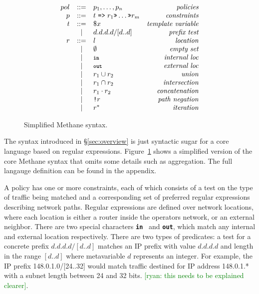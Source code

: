 \documentclass{sig-alternate-10pt}
\newcommand{\ryan}[1]{\textcolor{green}{[ryan: #1]}}
\newcommand{\sysname}{{\small \sf Methane}\xspace}
\newcommand{\KW}[1]{\texttt{\small\bfseries{#1}}}
\newcommand{\Prefer}{\texttt{>>}}
\newcommand{\Path}{\texttt{=>}}
\newcommand{\In}{\KW{in}}
\newcommand{\Out}{\KW{out}}
\newcommand{\NOT}{\texttt{!}}
\newcommand{\BNFALT}{\;\;|\;\;}
\begin{document}
\begin{figure}[t]\small
  \begin{minipage}[t]{\linewidth}
  \vspace*{-1\baselineskip}
  \[ \begin{array}{rclr}
     pol     &::=& p_1, \dots, p_n & \textit{policies} \\
     p       &::=& t \hspace{.3em} \Path \hspace{.3em} r_1 \Prefer \dots \Prefer r_m & \textit{constraints} \\
     t       &::=& \$x & \textit{template variable} \\
         &\BNFALT& d.d.d.d/[d..d] & \textit{prefix test} \\
     r       &::=& l & \textit{location} \\
         &\BNFALT& \emptyset & \textit{empty set} \\
         &\BNFALT& \In & \textit{internal loc} \\
         &\BNFALT& \Out & \textit{external loc} \\
         &\BNFALT& r_1 \cup r_2 & \textit{union} \\
         &\BNFALT& r_1 \cap r_2 & \textit{intersection} \\
         &\BNFALT& r_1 \cdot r_2 & \textit{concatenation} \\
         &\BNFALT& \NOT r & \textit{path negation} \\
         &\BNFALT& r^* & \textit{iteration} \\
  \end{array} \]%

  \end{minipage}
  \vspace{1em}
  \caption{Simplified \sysname syntax.}
  \label{fig:syntax}
\end{figure}%

The syntax introduced in \S\ref{sec:overview} is just syntactic sugar for a core language based on regular expressions. Figure~\ref{fig:syntax} shows a simplified version of the core \sysname syntax that omits some details such as aggregation. The full langauge definition can be found in the appendix. 

A policy has one or more constraints, each of which consists of a test on the type of traffic being matched and a corresponding set of preferred regular expressions describing network paths. Regular expressions are defined over network locations, where each location is either a router inside the operators network, or an external neighbor. There are two special characters \In~ and \Out, which match any internal and external location respectively. There are two types of predicates: a test for a concrete prefix $d.d.d.d/[d..d]$ matches an IP prefix with value $d.d.d.d$ and length in the range $[d..d]$ where metavariable $d$ represents an integer. For example, the IP prefix 148.0.1.0/[24..32] would match traffic destined for IP address 148.0.1.* with a subnet length between 24 and 32 bits. \ryan{this needs to be explained clearer}.
\end{document}
